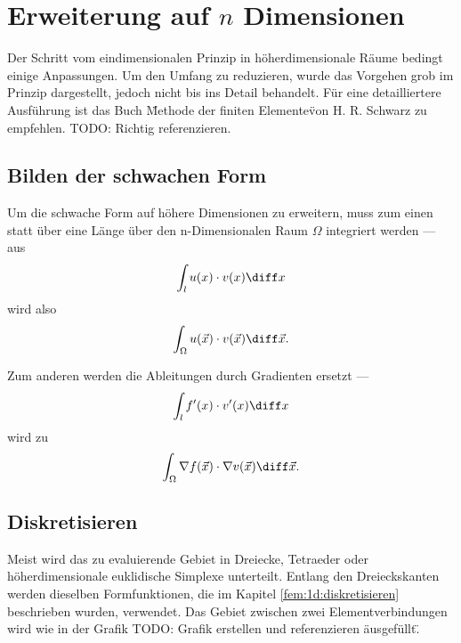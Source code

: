 %
%
%
%
\section{Erweiterung auf $n$ Dimensionen\label{fem:nD}}
Der Schritt vom eindimensionalen Prinzip in höherdimensionale Räume bedingt einige Anpassungen. 
Um den Umfang zu reduzieren, wurde das Vorgehen grob im Prinzip dargestellt, jedoch nicht bis ins Detail behandelt.
Für eine detailliertere Ausführung ist das Buch \"Methode der finiten Elemente\" von H. R. Schwarz zu empfehlen.
TODO: Richtig referenzieren.


\subsection{Bilden der schwachen Form}
Um die schwache Form auf höhere Dimensionen zu erweitern, muss zum einen statt über eine Länge über den n-Dimensionalen Raum $\Omega$ integriert werden --- aus 
\begin{equation}
    \int_{l} u(x) \cdot v(x) \diff x
\end{equation}
wird also
\begin{equation}
    \int_{\Omega} u(\vec{x}) \cdot v(\vec{x}) \diff \vec{x}.
\end{equation}

Zum anderen werden die Ableitungen durch Gradienten ersetzt ---
\begin{equation}
    \int_{l} f'(x) \cdot v'(x) \diff x
\end{equation}
wird zu
\begin{equation}
    \int_{\Omega} \nabla f(\vec{x}) \cdot \nabla v(\vec{x}) \diff \vec{x}.
\end{equation}


\subsection{Diskretisieren}
Meist wird das zu evaluierende Gebiet in Dreiecke, Tetraeder oder höherdimensionale euklidische Simplexe unterteilt. 
Entlang den Dreieckskanten werden dieselben Formfunktionen, die im Kapitel \ref{fem:1d:diskretisieren} beschrieben wurden, verwendet.
Das Gebiet zwischen zwei Elementverbindungen wird wie in der Grafik 
TODO: Grafik erstellen und referenzieren
\"ausgefüllt\".


